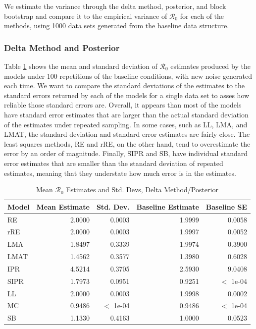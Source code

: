 \documentclass[12pt]{article}
\newcommand{\rr}{\ensuremath{\mathcal{R}_0}}
\begin{document}
We estimate the variance through the delta method, posterior, and  block bootstrap and compare it to the empirical variance of $\rr$ for each of the methods, using 1000 data sets generated from the baseline data structure.

\subsubsection{Delta Method and Posterior}

Table \ref{tab:rep-samp} shows the mean and standard deviation of $\rr$ estimates produced by the models under 100 repetitions of the baseline conditions, with new noise generated each time. We want to compare the standard deviations of the estimates to the standard errors returned by each of the models for a single data set to asses how reliable those standard errors are. Overall, it appears than most of the models have standard error estimates that are larger than the actual standard deviation of the estimates under repeated sampling. In some cases, such as LL, LMA, and LMAT, the standard deviation and standard error estimates are fairly close. The least squares methods, RE and rRE, on the other hand, tend to overestimate the error by an order of magnitude. Finally, SIPR and SB, have individual standard error estimates that are smaller than the standard deviation of repeated estimates, meaning that they understate how much error is in the estimates.


\begin{table}[H]
	
	\centering
	\begin{tabular}[t]{l|r|r|r|r}
		\hline
		Model & Mean Estimate & Std. Dev. & Baseline Estimate & Baseline SE\\
		\hline
		RE & 2.0000 & 0.0003 & 1.9999 & 0.0058\\
		\hline
		rRE & 2.0000 & 0.0003 & 1.9997 & 0.0052\\
		\hline
		LMA & 1.8497 & 0.3339 & 1.9974 & 0.3900\\
		\hline
		LMAT & 1.4562 & 0.3577 & 1.3980 & 0.6028 \\
		\hline
		IPR & 4.5214 & 0.3705 & 2.5930 & 9.0408\\
		\hline
		SIPR & 1.7973 & 0.0951 & 0.9251 & $<$ 1e-04 \\
		\hline
		LL & 2.0000 & 0.0003 & 1.9998 & 0.0002\\
		\hline
		MC & 0.9486 & $<$ 1e-04 & 0.9486 & $<$ 1e-04\\
		\hline
		SB & 1.1330 & 0.4163 & 1.0000 & 0.0523\\
		\hline
	\end{tabular}
        \caption{Mean $\rr$ Estimates and Std. Devs, Delta Method/Posterior}
        \label{tab:rep-samp}
\end{table}
\end{document}

